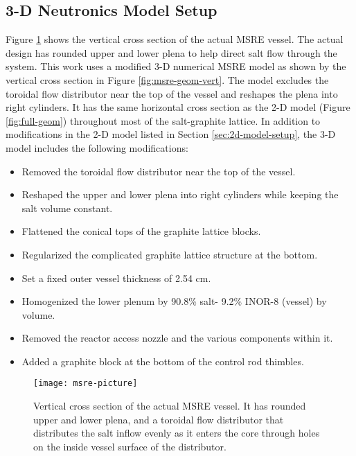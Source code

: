 \subsection{3-D Neutronics Model Setup} \label{sec:3d-model-setup}

Figure \ref{fig:msre-picture} shows the vertical cross section of the actual \gls{MSRE} vessel.
The actual design has rounded upper and lower plena to help direct salt flow through the system.
This work uses a modified 3-D numerical \gls{MSRE} model as shown by the vertical cross section
in Figure \ref{fig:msre-geom-vert}. The model excludes the toroidal flow distributor near the top
of the vessel and reshapes the plena into right cylinders. It has the same horizontal cross section
as the 2-D model (Figure \ref{fig:full-geom}) throughout most of the salt-graphite lattice. In
addition to modifications in the 2-D model listed in Section \ref{sec:2d-model-setup}, the
3-D model includes the following modifications:

\begin{itemize}
  \item Removed the toroidal flow distributor near the top of the vessel.
  \item Reshaped the upper and lower plena into right cylinders while keeping the salt volume
    constant.
  \item Flattened the conical tops of the graphite lattice blocks.
  \item Regularized the complicated graphite lattice structure at the bottom.
  \item Set a fixed outer vessel thickness of 2.54 cm.
  \item Homogenized the lower plenum by 90.8\% salt- 9.2\% INOR-8 (vessel) by volume.
  \item Removed the reactor access nozzle and the various components within it.
  \item Added a graphite block at the bottom of the control rod thimbles.
\end{itemize}

\begin{figure}[p]
  \centering
  \texttt{[image: msre-picture]}
  \caption{Vertical cross section of the actual \gls{MSRE} vessel. It has rounded upper and lower
  plena, and a toroidal flow distributor that distributes the salt inflow evenly as it enters the
  core through holes on the inside vessel surface of the distributor.}
  \label{fig:msre-picture}
\end{figure}

